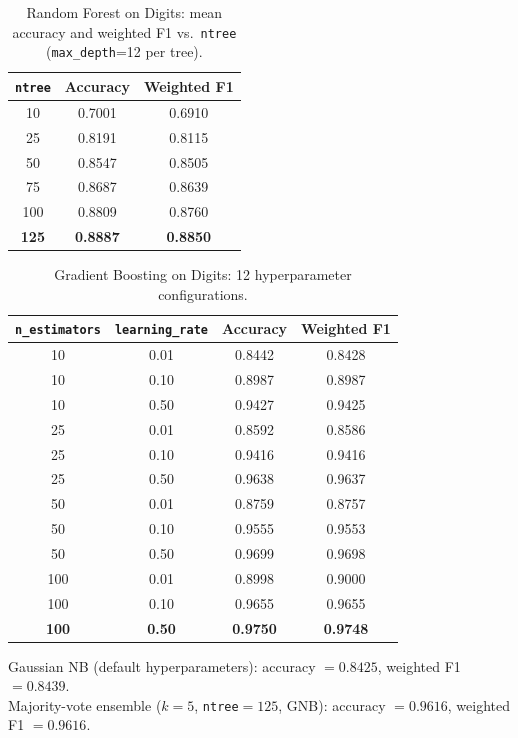 \documentclass[11pt,letterpaper]{article}
\begin{document}
\begin{table}[H]
\centering
\caption{Random Forest on Digits: mean accuracy and weighted F1 vs.\
         \texttt{ntree} (\texttt{max\_depth}=12 per tree).}
\label{tab:d1_rf}
\begin{tabular}{@{}ccc@{}}
\toprule
\texttt{ntree} & Accuracy & Weighted F1 \\
\midrule
10  & 0.7001 & 0.6910 \\
25  & 0.8191 & 0.8115 \\
50  & 0.8547 & 0.8505 \\
75  & 0.8687 & 0.8639 \\
100 & 0.8809 & 0.8760 \\
\rowcolor{hilight}
\textbf{125} & \textbf{0.8887} & \textbf{0.8850} \\
\bottomrule
\end{tabular}
\end{table}

\begin{table}[H]
\centering
\caption{Gradient Boosting on Digits: 12 hyperparameter configurations.}
\label{tab:d1_gb}
\begin{tabular}{@{}cccc@{}}
\toprule
\texttt{n\_estimators} & \texttt{learning\_rate}
  & Accuracy & Weighted F1 \\
\midrule
10  & 0.01 & 0.8442 & 0.8428 \\
10  & 0.10 & 0.8987 & 0.8987 \\
10  & 0.50 & 0.9427 & 0.9425 \\
25  & 0.01 & 0.8592 & 0.8586 \\
25  & 0.10 & 0.9416 & 0.9416 \\
25  & 0.50 & 0.9638 & 0.9637 \\
50  & 0.01 & 0.8759 & 0.8757 \\
50  & 0.10 & 0.9555 & 0.9553 \\
50  & 0.50 & 0.9699 & 0.9698 \\
100 & 0.01 & 0.8998 & 0.9000 \\
100 & 0.10 & 0.9655 & 0.9655 \\
\rowcolor{hilight}
\textbf{100} & \textbf{0.50} & \textbf{0.9750} & \textbf{0.9748} \\
\bottomrule
\end{tabular}
\end{table}

\noindent Gaussian NB (default hyperparameters):
accuracy $= 0.8425$, weighted F1 $= 0.8439$.\\
Majority-vote ensemble ($k=5$, \texttt{ntree}$=125$, GNB):
accuracy $= 0.9616$, weighted F1 $= 0.9616$.
\end{document}
